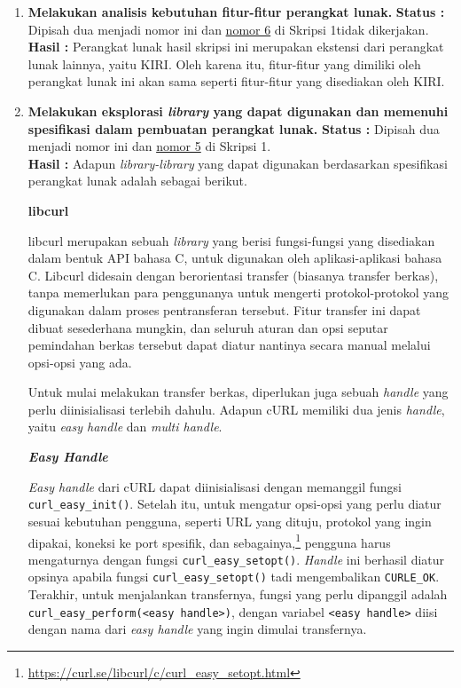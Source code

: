 \documentclass[a4paper,twoside]{article}
\begin{document}
\begin{enumerate}
\begin{itemize}
\end{itemize}
		
		\item \textbf{Melakukan analisis kebutuhan fitur-fitur perangkat lunak.}		
		\label{sec:num5} \newline
		{\bf Status :} Dipisah dua menjadi nomor ini dan \hyperref[sec:num6]{nomor 6} di Skripsi 1\textemdash tidak dikerjakan.\\
		{\bf Hasil :} Perangkat lunak hasil skripsi ini merupakan ekstensi dari perangkat lunak lainnya, yaitu KIRI. Oleh karena itu, fitur-fitur yang dimiliki oleh perangkat lunak ini akan sama seperti fitur-fitur yang disediakan oleh KIRI.
		
		
		\item \textbf{Melakukan eksplorasi \textit{library} yang dapat digunakan dan memenuhi spesifikasi dalam pembuatan perangkat lunak.}
		\label{sec:num6} \newline
		{\bf Status :} Dipisah dua menjadi nomor ini dan \hyperref[sec:num5]{nomor 5} di Skripsi 1.\\
		{\bf Hasil :} Adapun \textit{library-library} yang dapat digunakan berdasarkan spesifikasi perangkat lunak adalah sebagai berikut.
		
\large{\textbf{libcurl \cite{stenberg:2022:everythingcurl}}}
\label{sec:cmodules-libcurl}

libcurl merupakan sebuah \textit{library} yang berisi fungsi-fungsi yang disediakan dalam bentuk API bahasa C, untuk digunakan oleh aplikasi-aplikasi bahasa C. Libcurl didesain dengan berorientasi transfer (biasanya transfer berkas), tanpa memerlukan para penggunanya untuk mengerti protokol-protokol yang digunakan dalam proses pentransferan tersebut. Fitur transfer ini dapat dibuat sesederhana mungkin, dan seluruh aturan dan opsi seputar pemindahan berkas tersebut dapat diatur nantinya secara manual melalui opsi-opsi yang ada.

Untuk mulai melakukan transfer berkas, diperlukan juga sebuah \textit{handle} yang perlu diinisialisasi terlebih dahulu. Adapun cURL memiliki dua jenis \textit{handle}, yaitu \textit{easy handle} dan \textit{multi handle}. 

\textbf{\textit{Easy Handle}}
\label{sec:cmodules-libcurl-handleeasy}

\textit{Easy handle} dari cURL dapat diinisialisasi dengan memanggil fungsi \verb|curl_easy_init()|. Setelah itu, untuk mengatur opsi-opsi yang perlu diatur sesuai kebutuhan pengguna, seperti URL yang dituju, protokol yang ingin dipakai, koneksi ke port spesifik, dan sebagainya,\footnote{\href{https://curl.se/libcurl/c/curl\_easy\_setopt.html}{https://curl.se/libcurl/c/curl\_easy\_setopt.html}} pengguna harus mengaturnya dengan fungsi \verb|curl_easy_setopt()|. \textit{Handle} ini berhasil diatur opsinya apabila fungsi \verb|curl_easy_setopt()| tadi mengembalikan \verb|CURLE_OK|. Terakhir, untuk menjalankan transfernya, fungsi yang perlu dipanggil adalah \verb|curl_easy_perform(<easy handle>)|, dengan variabel \verb|<easy handle>| diisi dengan nama dari \textit{easy handle} yang ingin dimulai transfernya.


\end{enumerate}
\end{document}

